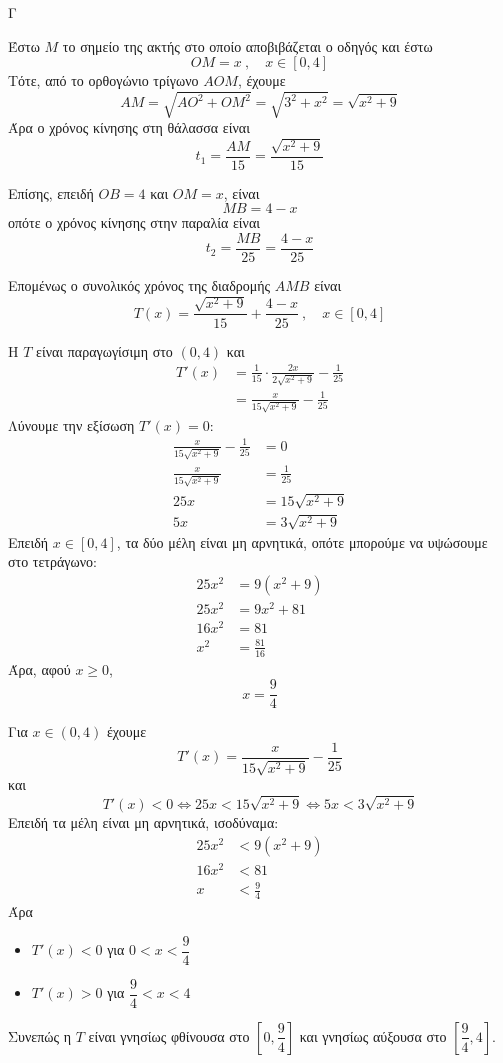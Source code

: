 \begin{thema}{Γ}
\begin{erwthma}
\item Έστω $M$ το σημείο της ακτής στο οποίο αποβιβάζεται ο οδηγός και έστω
\[OM=x\ ,\quad x\in[0,4]\]
Τότε, από το ορθογώνιο τρίγωνο $AOM$, έχουμε
\[AM=\sqrt{AO^2+OM^2}=\sqrt{3^2+x^2}=\sqrt{x^2+9}\]
Άρα ο χρόνος κίνησης στη θάλασσα είναι
\[t_1=\frac{AM}{15}=\frac{\sqrt{x^2+9}}{15}\]

Επίσης, επειδή $OB=4$ και $OM=x$, είναι
\[MB=4-x\]
οπότε ο χρόνος κίνησης στην παραλία είναι
\[t_2=\frac{MB}{25}=\frac{4-x}{25}\]

Επομένως ο συνολικός χρόνος της διαδρομής $AMB$ είναι
\[T(x)=\frac{\sqrt{x^2+9}}{15}+\frac{4-x}{25}\ ,\quad x\in[0,4]\]

\item Η $T$ είναι παραγωγίσιμη στο $(0,4)$ και
\begin{align*}
T'(x)&=\frac{1}{15}\cdot\frac{2x}{2\sqrt{x^2+9}}-\frac{1}{25}\\
&=\frac{x}{15\sqrt{x^2+9}}-\frac{1}{25}
\end{align*}
Λύνουμε την εξίσωση $T'(x)=0$:
\begin{align*}
\frac{x}{15\sqrt{x^2+9}}-\frac{1}{25}&=0\\
\frac{x}{15\sqrt{x^2+9}}&=\frac{1}{25}\\
25x&=15\sqrt{x^2+9}\\
5x&=3\sqrt{x^2+9}
\end{align*}
Επειδή $x\in[0,4]$, τα δύο μέλη είναι μη αρνητικά, οπότε μπορούμε να υψώσουμε στο τετράγωνο:
\begin{align*}
25x^2&=9(x^2+9)\\
25x^2&=9x^2+81\\
16x^2&=81\\
x^2&=\frac{81}{16}
\end{align*}
Άρα, αφού $x\geq 0$,
\[x=\frac{9}{4}\]

\item Για $x\in(0,4)$ έχουμε
\[T'(x)=\frac{x}{15\sqrt{x^2+9}}-\frac{1}{25}\]
και
\[T'(x)<0 \Leftrightarrow 25x<15\sqrt{x^2+9}\Leftrightarrow 5x<3\sqrt{x^2+9}\]
Επειδή τα μέλη είναι μη αρνητικά, ισοδύναμα:
\begin{align*}
25x^2&<9(x^2+9)\\
16x^2&<81\\
x&<\frac{9}{4}
\end{align*}
Άρα
\begin{itemize}
\item $T'(x)<0$ για $0<x<\dfrac{9}{4}$
\item $T'(x)>0$ για $\dfrac{9}{4}<x<4$
\end{itemize}
Συνεπώς η $T$ είναι γνησίως φθίνουσα στο $\left[0,\dfrac{9}{4}\right]$ και γνησίως αύξουσα στο $\left[\dfrac{9}{4},4\right]$.


\end{erwthma}
\end{thema}
